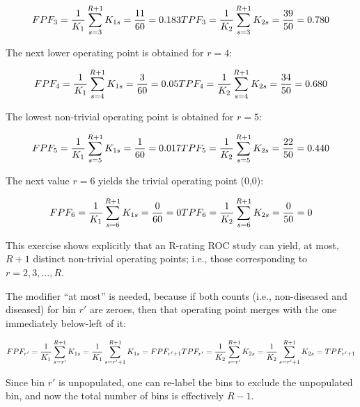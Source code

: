 \documentclass[
]{book}
\begin{document}
\begin{equation*} 
FPF_3=\frac {1} {K_1} \sum_{s=3}^{R+1}K_{1s} = \frac{11}{60} = 0.183\\
TPF_3=\frac {1} {K_2} \sum_{s=3}^{R+1}K_{2s} = \frac{39}{50} = 0.780
\end{equation*}

The next lower operating point is obtained for \(r = 4\):

\begin{equation*} 
FPF_4=\frac {1} {K_1} \sum_{s=4}^{R+1}K_{1s} = \frac{3}{60} = 0.05\\
TPF_4=\frac {1} {K_2} \sum_{s=4}^{R+1}K_{2s} = \frac{34}{50} = 0.680
\end{equation*}

The lowest non-trivial operating point is obtained for \(r = 5\):

\begin{equation*} 
FPF_5=\frac {1} {K_1} \sum_{s=5}^{R+1}K_{1s} = \frac{1}{60} = 0.017\\
TPF_5=\frac {1} {K_2} \sum_{s=5}^{R+1}K_{2s} = \frac{22}{50} = 0.440
\end{equation*}

The next value \(r = 6\) yields the trivial operating point (0,0):

\begin{equation*} 
FPF_6=\frac {1} {K_1} \sum_{s=6}^{R+1}K_{1s} = \frac{0}{60} = 0\\
TPF_6=\frac {1} {K_2} \sum_{s=6}^{R+1}K_{2s} = \frac{0}{50} = 0
\end{equation*}

This exercise shows explicitly that an R-rating ROC study can yield, at most, \(R + 1\) distinct non-trivial operating points; i.e., those corresponding to \(r=2,3,...,R\).

The modifier ``at most'' is needed, because if both counts (i.e., non-diseased and diseased) for bin \(r'\) are zeroes, then that operating point merges with the one immediately below-left of it:

\begin{equation*} 
FPF_{r'}=\frac {1} {K_1} \sum_{s={r'}}^{R+1}K_{1s} = \frac {1} {K_1} \sum_{s={r'+1}}^{R+1}K_{1s} = FPF_{r'+1}\\
\\
TPF_{r'}=\frac {1} {K_2} \sum_{s={r'}}^{R+1}K_{2s} = \frac {1} {K_2} \sum_{s={r'+1}}^{R+1}K_{2s} = TPF_{r'+1}
\end{equation*}

Since bin \(r'\) is unpopulated, one can re-label the bins to exclude the unpopulated bin, and now the total number of bins is effectively \(R-1\).
\end{document}
